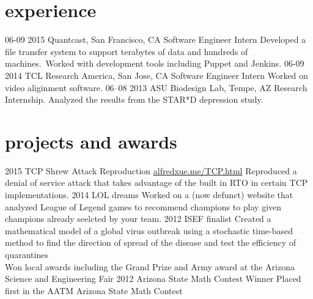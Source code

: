 \documentclass[]{friggeri-cv}
\begin{document}
\section{experience}

\begin{entrylist}
  \entry
    {06-09 2015}
    {Quantcast, San Francisco, CA}
    {Software Engineer Intern}
    {Developed a file transfer system to support terabytes of data and hundreds of machines.\
     Worked with development tools including Puppet and Jenkins.}
  \entry
    {06-09 2014}
    {TCL Research America, San Jose, CA}
    {Software Engineer Intern}
    {Worked on video aliginment software.} 
  \entry
    {06–08 2013}
    {ASU Biodesign Lab, Tempe, AZ}
    {Research Internship.}
    {Analyzed the results from the STAR*D depression study.} 
\end{entrylist}

\section{projects and awards}

\begin{entrylist}
  \entry
    {2015}
    {TCP Shrew Attack Reproduction}
    {\href{http://reproducingnetworkresearch.wordpress.com/2015/05/31/cs24415-denial-of-service-using-tcps-rto/}{alfredxue.me/TCP.html}}
    {Reproduced a denial of service attack that takes advantage of the built in RTO in certain TCP implementations.}
  \entry
    {2014}
    {LOL dreams}
    {}
    {Worked on a (now defunct) website that analyzed League of Legend games to recommend champions to play given champions already seelcted by your team.}
  \entry
    {2012}
    {ISEF finalist}
    {}
    {Created a mathematical model of a global virus outbreak using a stochastic time-based method to find the direction of spread of the disease and test the efficiency of quarantines\\
    Won local awards including the Grand Prize and Army award at the Arizona Science and Engineering Fair}
  \entry 
    {2012}
    {Arizona State Math Contest Winner}
    {}
    {Placed first in the AATM Arizona State Math Contest}
\end{entrylist}
\end{document}
